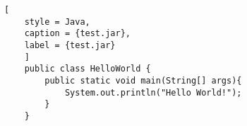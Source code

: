 

\begin{lstlisting}[
	style = Java,
	caption = {test.jar},
	label = {test.jar}
	]
	public class HelloWorld {
		public static void main(String[] args){
			System.out.println("Hello World!");
		}
	}
\end{lstlisting}


